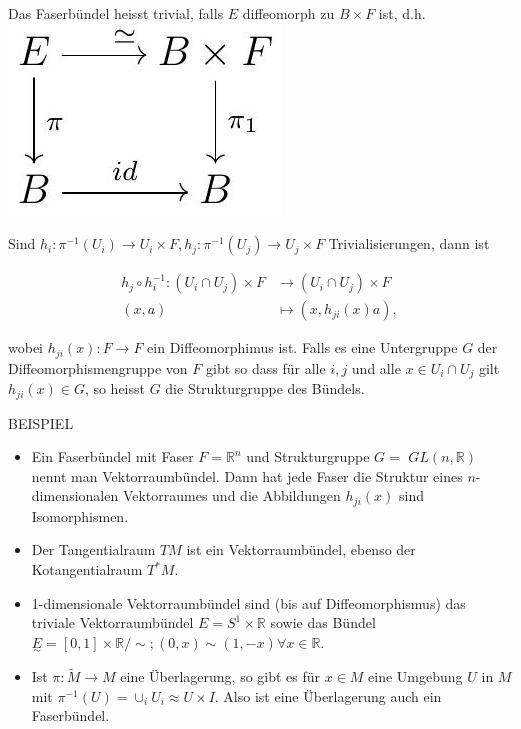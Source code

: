 \documentclass[10pt]{article}
\begin{document}
Das Faserbündel heisst trivial, falls $E$ diffeomorph zu $B \times F$ ist, d.h.\\
\includegraphics[max width=\textwidth, center]{2025_05_20_3825c151ba0898b77b6eg-068}

Sind $h_{i}: \pi^{-1}\left(U_{i}\right) \rightarrow U_{i} \times F, h_{j}: \pi^{-1}\left(U_{j}\right) \rightarrow U_{j} \times F$ Trivialisierungen, dann ist

$$
\begin{aligned}
h_{j} \circ h_{i}^{-1}:\left(U_{i} \cap U_{j}\right) \times F & \rightarrow\left(U_{i} \cap U_{j}\right) \times F \\
(x, a) & \mapsto\left(x, h_{j i}(x) a\right),
\end{aligned}
$$

wobei $h_{j i}(x): F \rightarrow F$ ein Diffeomorphimus ist. Falls es eine Untergruppe $G$ der Diffeomorphismengruppe von $F$ gibt so dass für alle $i, j$ und alle $x \in U_{i} \cap U_{j}$ gilt $h_{j i}(x) \in G$, so heisst $G$ die Strukturgruppe des Bündels.

BEISPIEL

\begin{itemize}
  \item Ein Faserbündel mit Faser $F=\mathbb{R}^{n}$ und Strukturgruppe $G=$ $G L(n, \mathbb{R})$ nennt man Vektorraumbündel. Dann hat jede Faser die Struktur eines $n$-dimensionalen Vektorraumes und die Abbildungen $h_{j i}(x)$ sind Isomorphismen.
  \item Der Tangentialraum $T M$ ist ein Vektorraumbündel, ebenso der Kotangentialraum $T^{*} M$.
  \item 1-dimensionale Vektorraumbündel sind (bis auf Diffeomorphismus) das triviale Vektorraumbündel $E=S^{1} \times \mathbb{R}$ sowie das Bündel $\underset{\sim}{E}=[0,1] \times \mathbb{R} / \sim ;(0, x) \sim(1,-x) \forall x \in \mathbb{R}$.
  \item Ist $\pi: \tilde{M} \rightarrow M$ eine Überlagerung, so gibt es für $x \in M$ eine Umgebung $U$ in $M$ mit $\pi^{-1}(U)=\cup_{i} U_{i} \approx U \times I$. Also ist eine Überlagerung auch ein Faserbündel.
\end{itemize}
\end{document}
